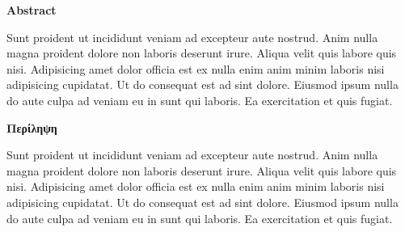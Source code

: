 \pagestyle{empty}
{\textbf{Abstract}\\[1cm]}

Sunt proident ut incididunt veniam ad excepteur aute nostrud. Anim nulla magna proident dolore non laboris deserunt irure. 
Aliqua velit quis labore quis nisi. Adipisicing amet dolor officia est ex nulla enim anim minim laboris nisi adipisicing cupidatat. 
Ut do consequat est ad sint dolore. Eiusmod ipsum nulla do aute culpa ad veniam eu in sunt qui laboris. Ea exercitation et quis fugiat.

\newpage{\pagestyle{empty}\cleardoublepage}

\newpage
\pagestyle{empty}
{\textbf{Περίληψη}\\[1cm]}

Sunt proident ut incididunt veniam ad excepteur aute nostrud. Anim nulla magna proident dolore non laboris deserunt irure. 
Aliqua velit quis labore quis nisi. Adipisicing amet dolor officia est ex nulla enim anim minim laboris nisi adipisicing cupidatat. 
Ut do consequat est ad sint dolore. Eiusmod ipsum nulla do aute culpa ad veniam eu in sunt qui laboris. Ea exercitation et quis fugiat.

